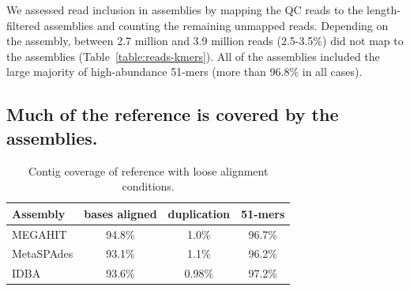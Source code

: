 \documentclass[11pt]{article}
\begin{document}
We assessed read inclusion in assemblies by mapping the QC reads to
the length-filtered assemblies and counting the remaining unmapped
reads. Depending on the assembly, between 2.7 million and 3.9 million
reads (2.5-3.5\%) did not map to the assemblies
(Table~\ref{table:reads-kmers}).  All of the assemblies included the large
majority of high-abundance 51-mers (more than 96.8\% in all cases).

\subsection*{Much of the reference is covered by the assemblies.}






\begin{table}[!h]
\centering
\caption{Contig coverage of reference with loose alignment conditions.}
\begin{tabular}{|l|c|c|c|}\hline
  \textbf{Assembly} & \textbf{bases aligned} & \textbf{duplication}
  & \textbf{51-mers}
  \\ \hline
MEGAHIT & 94.8\% & 1.0\% & 96.7\% \\ \hline
MetaSPAdes  & 93.1\% & 1.1\% & 96.2\% \\ \hline
IDBA    & 93.6\% & 0.98\% & 97.2\% \\ \hline
\end{tabular}
\label{table:contig-coverage}
\end{table}

\end{document}
